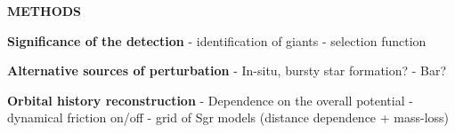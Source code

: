 \documentclass{natureprintstyle}
\begin{document}

\pagebreak

\setcounter{page}{1}
\setcounter{figure}{0}
\setcounter{table}{0}
\captionsetup[figure]{labelformat=empty}
\renewcommand{\thefigure}{Extended Data \arabic{figure}}
\renewcommand{\thetable}{Extended Data \arabic{table}}

\begin{center}
{\bf \Large \uppercase{Methods}}
\end{center}

\noindent
{\bf Significance of the detection}
- identification of giants
- selection function

{\bf Alternative sources of perturbation}
- In-situ, bursty star formation?
- Bar?

{\bf Orbital history reconstruction}
- Dependence on the overall potential
- dynamical friction on/off
- grid of Sgr models (distance dependence + mass-loss)
\end{document}
